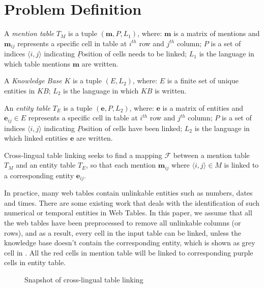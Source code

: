 \section{Problem Definition}
\label{sec:problem}

\begin{definition}
\label{def:mention}
A {\em mention table} $T_M$ is a tuple $(\textbf{m}, P, L_1)$, where:
$\textbf{m}$ is a matrix of mentions and $\textbf{m}_{ij}$ represents a specific cell in table at $i^{th}$ row and $j^{th}$ column;
$P$ is a set of indices $\langle i,j  \rangle$ indicating $\underline{P}$osition of cells needs to be linked;
$L_1$ is the language in which table mentions $\textbf{m}$ are written.
\end{definition}

\begin{definition}
	A {\em Knowledge Base} $K$ is a tuple $(E, L_2)$, where:
	$E$ is a finite set of unique entities in $KB$;
	$L_2$ is the language in which $KB$ is written.
\end{definition}

\begin{definition}
An {\em entity table} $T_E$ is a tuple $(\textbf{e}, P, L_2)$, where:
$\textbf{e}$ is a matrix of entities and $\textbf{e}_{ij} \in E$ represents a specific cell in table at $i^{th}$ row and $j^{th}$ column;
$P$ is a set of indices $\langle i,j  \rangle$ indicating $\underline{P}$osition of cells have been linked;
$L_2$ is the language in which linked entities $\textbf{e}$ are written.
\end{definition}

\begin{definition}
Cross-lingual table linking seeks to find a mapping $\mathcal{F}$ between a mention table $T_M$ and an entity table $T_E$, so that each mention $\textbf{m}_{ij}$ where $\langle i,j\rangle \in M$ is linked to a corresponding entity $\textbf{e}_{ij}$.
\end{definition}

In practice, many web tables contain unlinkable entities such as numbers, dates
and times. There are some existing work that deals with the identification of
such numerical or temporal entities in Web Tables\cite{sun2015modeling}. 
In this paper, we assume that all the web tables have been preprocessed to 
remove all unlinkable columns (or rows), and as a result, every cell in the input table can be linked, unless the knowledge base doesn't contain the corresponding entity, which is shown as grey cell in . All the red cells in mention table will be linked to corresponding purple cells in entity table.

 
\begin{figure}[th]
	\caption{Snapshot of cross-lingual table linking}
	\label{fig:problem}
\end{figure}

